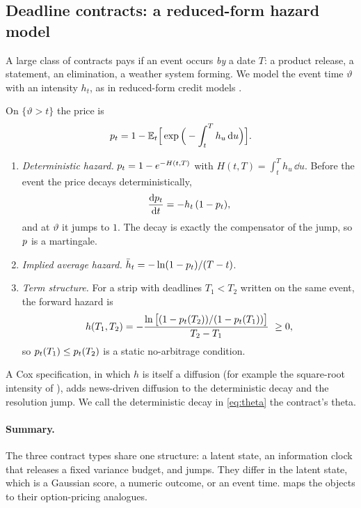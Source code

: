 \subsection{Deadline contracts: a reduced-form hazard model}\label{sec:model-hazard}

A large class of contracts pays if an event occurs \emph{by} a date $T$: a product release, a
statement, an elimination, a weather system forming. We model the event time $\vartheta$ with an
intensity $h_t$, as in reduced-form credit models
\citep{jarrowturnbull1995,lando1998,duffiesingleton1999}.

\begin{proposition}\label{prop:hazard}
On $\{\vartheta>t\}$ the price is
\[
  p_t=1-\mathbb{E}_t\Big[\exp\Big(-\int_t^T h_u\,\mathrm{d} u\Big)\Big].
\]
\begin{enumerate}
  \item \emph{Deterministic hazard.} $p_t=1-e^{-H(t,T)}$ with $H(t,T)=\int_t^T h_u\,\dd u$. Before
  the event the price decays deterministically,
  \begin{equation}\label{eq:theta}
    \frac{\mathrm{d}p_t}{\mathrm{d} t}=-h_t\,(1-p_t),
  \end{equation}
  and at $\vartheta$ it jumps to $1$. The decay is exactly the compensator of the jump, so $p$ is
  a martingale.
  \item \emph{Implied average hazard.} $\bar h_t=-\ln(1-p_t)/(T-t)$.
  \item \emph{Term structure.} For a strip with deadlines $T_1<T_2$ written on the same event, the
  forward hazard is
  \[
    h(T_1,T_2)=-\frac{\ln\big[(1-\pr_t(T_2))/(1-\pr_t(T_1))\big]}{T_2-T_1}\ \ge 0,
  \]
  so $p_t(T_1)\le p_t(T_2)$ is a static no-arbitrage condition.
\end{enumerate}
\end{proposition}

A Cox specification, in which $h$ is itself a diffusion (for example the square-root intensity
of \citealp{cox1985cir}), adds news-driven diffusion to the deterministic decay and the resolution jump. We call the
deterministic decay in \eqref{eq:theta} the contract's theta.

\paragraph{Summary.} The three contract types share one structure: a latent state, an information
clock that releases a fixed variance budget, and jumps. They differ in the latent state, which is
a Gaussian score, a numeric outcome, or an event time.  maps the objects to
their option-pricing analogues.

